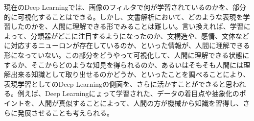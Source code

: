 現在のDeep Learningでは、画像のフィルタで何が学習されているのかを、部分的に可視化することはできる。しかし、文書解析において、どのような表現を学習したのかを、人間に理解できる形でみることは難しい。言い換えれば、学習によって、分類器がどこに注目するようになったのか、文構造や、感情、文体などに対応するニューロンが存在しているのか、といった情報が、人間に理解できる形になっていない。この部分をどうやって可視化して、人間に理解できる状態にするか、そこからどのような知見を得られるのか、あるいはそもそも人間には理解出来る知識として取り出せるのかどうか、といったことを調べることにより、表現学習としてのDeep Learningの側面を、さらに活かすことができると思われる。例えば、Deep Learningにょって学習された、データの着目点や抽象化のポイントを、人間が真似することによって、人間の方が機械から知識を習得し、さらに発展させることも考えられる。
